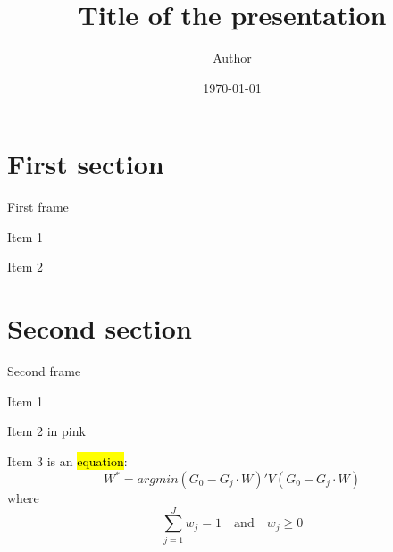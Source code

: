 \documentclass[11pt, hyperref = {unicode}, aspectratio=169]{beamer}
\title[Title]{\firamedium\LARGE Title of the presentation}
\author[Author]{\firamedium Author}
\date{\small \today}
\makeatletter
\newenvironment{wideitemize}{\itemize\addtolength{\itemsep}{0.6ex}}{\enditemize} %
\let\HL\hl
\renewcommand\hl{%
	\let\set@color\beamerorig@set@color
	\let\reset@color\beamerorig@reset@color
	\HL}
\newcommand{\hlight}[1]{{\sethlcolor{Color3}\hl{#1}}}
\makeatother
\begin{document}
	\begin{frame}
		\titlepage
	\end{frame}
	
	\section{First section}
	
	\begin{frame}{First frame}
		\begin{wideitemize}
			\item Item 1
			\item Item 2
		\end{wideitemize}
	\end{frame}
	
	\section{Second section}
	\begin{frame}{Second frame}
		\begin{wideitemize}
			\item<1-> Item 1
			\item<2-> Item 2 in \textcolor{Color4}{pink}
			\item<3-> Item 3 is an \hlight{equation}:
			\[W^* = argmin (G_0 - G_j\cdot W)'V(G_0 - G_j\cdot W)
			\]
			where \[\sum\limits_{j=1}^J w_j = 1 \quad \text{and} \quad w_j \geq 0\]
		\end{wideitemize}
	\end{frame}
\end{document}
